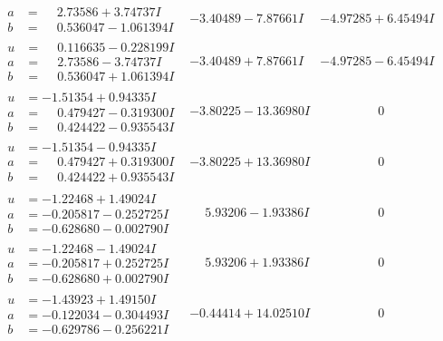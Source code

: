 \documentclass[1p]{elsarticle_modified}
\theoremstyle{definition}
\begin{document}
$$\begin{array}{c|c|c}
\begin{aligned}
a &= \phantom{-}2.73586 + 3.74737 I \\
b &= \phantom{-}0.536047 - 1.061394 I\end{aligned}
 & -3.40489 - 7.87661 I & -4.97285 + 6.45494 I \\ \hline\begin{aligned}
u &= \phantom{-}0.116635 - 0.228199 I \\
a &= \phantom{-}2.73586 - 3.74737 I \\
b &= \phantom{-}0.536047 + 1.061394 I\end{aligned}
 & -3.40489 + 7.87661 I & -4.97285 - 6.45494 I \\ \hline\begin{aligned}
u &= -1.51354 + 0.94335 I \\
a &= \phantom{-}0.479427 - 0.319300 I \\
b &= \phantom{-}0.424422 - 0.935543 I\end{aligned}
 & -3.80225 - 13.36980 I & \phantom{-0.000000 } 0 \\ \hline\begin{aligned}
u &= -1.51354 - 0.94335 I \\
a &= \phantom{-}0.479427 + 0.319300 I \\
b &= \phantom{-}0.424422 + 0.935543 I\end{aligned}
 & -3.80225 + 13.36980 I & \phantom{-0.000000 } 0 \\ \hline\begin{aligned}
u &= -1.22468 + 1.49024 I \\
a &= -0.205817 - 0.252725 I \\
b &= -0.628680 - 0.002790 I\end{aligned}
 & \phantom{-}5.93206 - 1.93386 I & \phantom{-0.000000 } 0 \\ \hline\begin{aligned}
u &= -1.22468 - 1.49024 I \\
a &= -0.205817 + 0.252725 I \\
b &= -0.628680 + 0.002790 I\end{aligned}
 & \phantom{-}5.93206 + 1.93386 I & \phantom{-0.000000 } 0 \\ \hline\begin{aligned}
u &= -1.43923 + 1.49150 I \\
a &= -0.122034 - 0.304493 I \\
b &= -0.629786 - 0.256221 I\end{aligned}
 & -0.44414 + 14.02510 I & \phantom{-0.000000 } 0 \\ \hline\begin{aligned}

\end{aligned}
\end{array}$$
\end{document}
